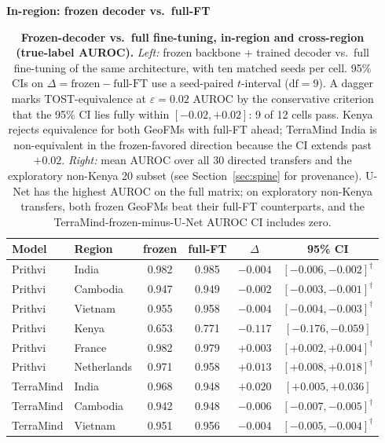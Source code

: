 \documentclass{article}
\newcommand{\tablebodygap}{\vspace{0.45em}}
\begin{document}
\begin{table}[!htb]
\centering\footnotesize
\caption{\textbf{Frozen-decoder vs.\ full fine-tuning, in-region and
cross-region (true-label AUROC).}
\emph{Left:} frozen backbone + trained decoder vs.\ full fine-tuning of the same
architecture, with ten matched seeds per cell. 95\% CIs on
$\Delta=\mathrm{frozen}-\mathrm{full\mbox{-}FT}$ use a seed-paired $t$-interval
($\mathrm{df}=9$). A dagger marks TOST-equivalence at $\varepsilon{=}0.02$ AUROC by the
conservative criterion that the 95\% CI lies fully within $[-0.02,+0.02]$:
9 of 12 cells pass. Kenya rejects equivalence for both GeoFMs with full-FT ahead;
TerraMind India is non-equivalent in the frozen-favored direction because the CI
extends past $+0.02$. \emph{Right:} mean AUROC over all 30 directed transfers and
the exploratory non-Kenya 20 subset (see Section~\ref{sec:spine} for provenance).
  U-Net has the highest AUROC on the full matrix; on exploratory non-Kenya transfers,
  both frozen GeoFMs beat their full-FT counterparts, and the TerraMind-frozen-minus-U-Net
  AUROC CI includes zero.}
\label{tab:spine}
\tablebodygap
\begin{minipage}[t]{0.59\linewidth}
\vspace{0pt}\centering\scriptsize
\textbf{In-region: frozen decoder vs.\ full-FT}\\[3pt]
\setlength{\tabcolsep}{2pt}
\begin{tabular*}{\linewidth}{@{\extracolsep{\fill}}llcccc@{}}
\toprule
Model & Region & frozen & full-FT & $\Delta$ & 95\% CI \\
\midrule
Prithvi & India & 0.982 & 0.985 & $-0.004$ & $[-0.006,-0.002]^\dagger$ \\
Prithvi & Cambodia & 0.947 & 0.949 & $-0.002$ & $[-0.003,-0.001]^\dagger$ \\
Prithvi & Vietnam & 0.955 & 0.958 & $-0.004$ & $[-0.004,-0.003]^\dagger$ \\
Prithvi & Kenya & 0.653 & 0.771 & $-0.117$ & $[-0.176,-0.059]$ \\
Prithvi & France & 0.982 & 0.979 & $+0.003$ & $[+0.002,+0.004]^\dagger$ \\
Prithvi & Netherlands & 0.971 & 0.958 & $+0.013$ & $[+0.008,+0.018]^\dagger$ \\
\midrule
TerraMind & India & 0.968 & 0.948 & $+0.020$ & $[+0.005,+0.036]$ \\
TerraMind & Cambodia & 0.942 & 0.948 & $-0.006$ & $[-0.007,-0.005]^\dagger$ \\
TerraMind & Vietnam & 0.951 & 0.956 & $-0.004$ & $[-0.005,-0.004]^\dagger$ \\

\end{tabular*}
\end{minipage}
\end{table}
\end{document}
